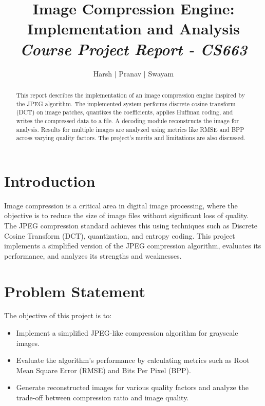 \documentclass{article}
\title{Image Compression Engine: Implementation and Analysis\\ \large{\textit{Course Project Report - CS663}}}
\author{Harsh $\vert$ Pranav $\vert$ Swayam}
\begin{document}
\maketitle
\flushleft

\tableofcontents
\newpage

\begin{abstract}
This report describes the implementation of an image compression engine inspired by the JPEG algorithm. The implemented system performs discrete cosine transform (DCT) on image patches, quantizes the coefficients, applies Huffman coding, and writes the compressed data to a file. A decoding module reconstructs the image for analysis. Results for multiple images are analyzed using metrics like RMSE and BPP across varying quality factors. The project's merits and limitations are also discussed.
\end{abstract}

\section{Introduction}
Image compression is a critical area in digital image processing, where the objective is to reduce the size of image files without significant loss of quality. The JPEG compression standard achieves this using techniques such as Discrete Cosine Transform (DCT), quantization, and entropy coding. This project implements a simplified version of the JPEG compression algorithm, evaluates its performance, and analyzes its strengths and weaknesses.

\section{Problem Statement}
The objective of this project is to:
\begin{itemize}
    \item Implement a simplified JPEG-like compression algorithm for grayscale images.
    \item Evaluate the algorithm's performance by calculating metrics such as Root Mean Square Error (RMSE) and Bits Per Pixel (BPP).
    \item Generate reconstructed images for various quality factors and analyze the trade-off between compression ratio and image quality.
\end{itemize}
\end{document}
